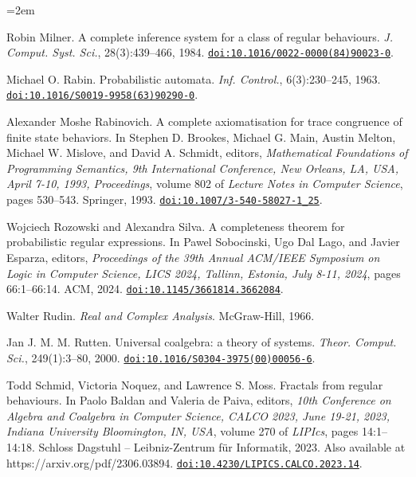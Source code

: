 \begin{list}{}{\leftmargin=2em}
\hypertarget{html:bib.bib15}{}
\item[]  [15]  Robin Milner.  A complete inference system for a class of regular behaviours.  \emph{J. Comput. Syst. Sci.}, 28(3):439–466, 1984.  \href{https://doi.org/10.1016/0022-0000(84)90023-0}{\nolinkurl{doi:10.1016/0022-0000(84)90023-0}}.  
\hypertarget{html:bib.bib16}{}
\item[]  [16]  Michael O. Rabin.  Probabilistic automata.  \emph{Inf. Control.}, 6(3):230–245, 1963.  \href{https://doi.org/10.1016/S0019-9958(63)90290-0}{\nolinkurl{doi:10.1016/S0019-9958(63)90290-0}}.  
\hypertarget{html:bib.bib17}{}
\item[]  [17]  Alexander Moshe Rabinovich.  A complete axiomatisation for trace congruence of finite state behaviors.  In Stephen D. Brookes, Michael G. Main, Austin Melton, Michael W. Mislove, and David A. Schmidt, editors, \emph{Mathematical Foundations of Programming Semantics, 9th International Conference, New Orleans, LA, USA, April 7-10, 1993, Proceedings}, volume 802 of \emph{Lecture Notes in Computer Science}, pages 530–543. Springer, 1993.  \href{https://doi.org/10.1007/3-540-58027-1_25}{\nolinkurl{doi:10.1007/3-540-58027-1_25}}.  
\hypertarget{html:bib.bib18}{}
\item[]  [18]  Wojciech Rozowski and Alexandra Silva.  A completeness theorem for probabilistic regular expressions.  In Pawel Sobocinski, Ugo Dal Lago, and Javier Esparza, editors, \emph{Proceedings of the 39th Annual ACM/IEEE Symposium on Logic in Computer Science, LICS 2024, Tallinn, Estonia, July 8-11, 2024}, pages 66:1–66:14. ACM, 2024.  \href{https://doi.org/10.1145/3661814.3662084}{\nolinkurl{doi:10.1145/3661814.3662084}}.  
\hypertarget{html:bib.bib19}{}
\item[]  [19]  Walter Rudin.  \emph{Real and Complex Analysis}.  McGraw-Hill, 1966.  
\hypertarget{html:bib.bib20}{}
\item[]  [20]  Jan J. M. M. Rutten.  Universal coalgebra: a theory of systems.  \emph{Theor. Comput. Sci.}, 249(1):3–80, 2000.  \href{https://doi.org/10.1016/S0304-3975(00)00056-6}{\nolinkurl{doi:10.1016/S0304-3975(00)00056-6}}.  
\hypertarget{html:bib.bib21}{}
\item[]  [21]  Todd Schmid, Victoria Noquez, and Lawrence S. Moss.  Fractals from regular behaviours.  In Paolo Baldan and Valeria de Paiva, editors, \emph{10th Conference on Algebra and Coalgebra in Computer Science, CALCO 2023, June 19-21, 2023, Indiana University Bloomington, IN, USA}, volume 270 of \emph{LIPIcs}, pages 14:1–14:18. Schloss Dagstuhl – Leibniz-Zentrum für Informatik, 2023.  Also available at https://arxiv.org/pdf/2306.03894.  \href{https://doi.org/10.4230/LIPICS.CALCO.2023.14}{\nolinkurl{doi:10.4230/LIPICS.CALCO.2023.14}}.  

\end{list}
